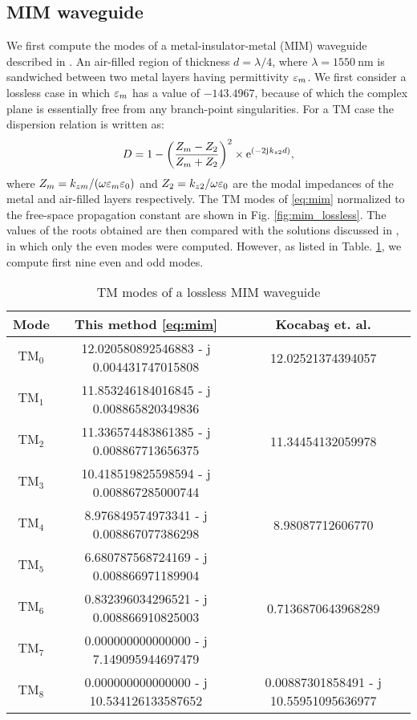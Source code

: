 \subsection{MIM waveguide}
%
%
We first compute the modes of a metal-insulator-metal (MIM) waveguide described in \cite{Kocabas2009}. An air-filled region of thickness $d = \lambda/4$, where $\lambda = \SI{1550}{\nm}$ is sandwiched between two metal layers having permittivity $\varepsilon_m$. We first consider a lossless case in which $\varepsilon_m$ has a value of $-143.4967$, because of which the complex plane is essentially free from any branch-point singularities. For a TM case the dispersion relation is written as:
%
\begin{equation}
  D =  1 - \left(\frac{Z_m - Z_2}{Z_m + Z_2}\right)^2 \times \mathrm{e}^{(-2\mathrm{j}\mkern1mu  k_{z2} d)},
  \label{eq:mim}
\end{equation}
%
where $Z_m = k_{zm}/(\omega \varepsilon_m \varepsilon_0)$ and $Z_2 = k_{z2}/{\omega \varepsilon_0}$ are the modal impedances of the metal and air-filled layers respectively. The TM modes of \eqref{eq:mim} normalized to the free-space propagation constant are shown in Fig. \ref{fig:mim_lossless}. The values of the roots obtained are then compared with the solutions discussed in \cite{Kocabas2009}, in which only the even modes were computed. However, as listed in Table. \ref{tab:kocabas_lossless}, we compute first nine even and odd modes.
%
\begin{table}[!htbp]
\begin{center}
 \begin{tabular}{||c |c |c||}
 \hline
 Mode & This method \eqref{eq:mim} & Kocaba{\c{s}} et. al. \cite{Kocabas2009} \\ [0.5ex]
 \hline\hline
 $\text{TM}_0$ & \num{12.020580892546883 - j 0.004431747015808} & \num{12.02521374394057} \\
 $\text{TM}_1$ & \num{11.853246184016845 - j 0.008865820349836} & \num{} \\
 $\text{TM}_2$ & \num{11.336574483861385 - j 0.008867713656375} & \num{11.34454132059978} \\
 $\text{TM}_3$ & \num{10.418519825598594 - j 0.008867285000744} & \num{} \\
 $\text{TM}_4$ & \num{8.976849574973341 - j 0.008867077386298} & \num{8.98087712606770} \\
 $\text{TM}_5$ & \num{6.680787568724169 - j 0.008866971189904} & \num{} \\
 $\text{TM}_6$ & \num{0.832396034296521 - j 0.008866910825003} & \num{0.7136870643968289} \\
 $\text{TM}_7$ & \num{0.000000000000000 - j 7.149095944697479} & \num{} \\
 $\text{TM}_8$ & \num{0.000000000000000 - j 10.534126133587652} & \num{0.00887301858491 - j 10.55951095636977} \\
 \hline
 \end{tabular}
  \end{center}
 \caption{TM modes of a lossless MIM waveguide}
 \label{tab:kocabas_lossless}
\end{table}
%

